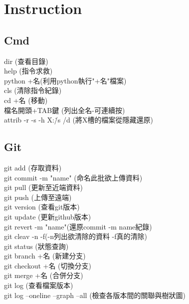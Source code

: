 \chapter{Instruction}
\section{Cmd}

dir (查看目錄)\\

help (指令求救)\\

python +名(利用python執行"+名"檔案)\\

cls (清除指令紀錄)\\

cd +名 (移動)\\

檔名開頭+TAB鍵 (列出全名-可連續按)\\

attrib -r -s -h X:\. /s /d (將X槽的檔案從隱藏還原)\\

\section{Git}


git add (存取資料)\\

git commit -m "name" (命名此批欲上傳資料)\\

git pull (更新至近端資料)\\

git push (上傳至遠端)\\

git version (查看git版本)\\

git update (更新github版本)\\

git revert -m "name"(還原commit -m name紀錄)\\

git cleav -n -f(-n列出欲清除的資料 -f真的清除)\\

git status (狀態查詢)\\

git branch +名 (新建分支)\\

git checkout +名 (切換分支)\\

git merge +名 (合併分支)\\

git log (查看檔案版本)\\

git log --oneline --graph --all (檢查各版本間的關聯與樹狀圖)\\
